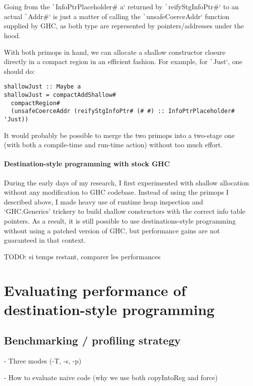 \documentclass[english]{jflart}
\begin{document}
Going from the \texttt`InfoPtrPlaceholder# a` returned by \texttt`reifyStgInfoPtr#` to an actual \texttt`Addr#` is just a matter of calling the \texttt`unsafeCoerceAddr` function supplied by GHC, as both type are represented by pointers/addresses under the hood.

With both primops in hand, we can allocate a shallow constructor closure directly in a compact region in an efficient fashion. For example, for \texttt`Just`, one should do:
\begin{verbatim}
shallowJust :: Maybe a
shallowJust = compactAddShallow#
  compactRegion#
  (unsafeCoerceAddr (reifyStgInfoPtr# (# #) :: InfoPtrPlaceholder# 'Just))  
\end{verbatim}

It would probably be possible to merge the two primops into a two-stage one (with both a compile-time and run-time action) without too much effort.

\paragraph{Destination-style programming with stock GHC}

During the early days of my research, I first experimented with shallow allocation without any modification to GHC codebase. Instead of using the primops I described above, I made heavy use of runtime heap inspection and `GHC.Generics' trickery to build shallow constructors with the correct info table pointers. As a result, it is still possible to use destinations-style programming without using a patched version of GHC, but performance gains are not guaranteed in that context.

TODO: si temps restant, comparer les performances

\section{Evaluating performance of destination-style programming}

\subsection{Benchmarking / profiling strategy}

- Three modes (-T, -s, -p)

- How to evaluate naive code (why we use both copyIntoReg and force)
\end{document}
